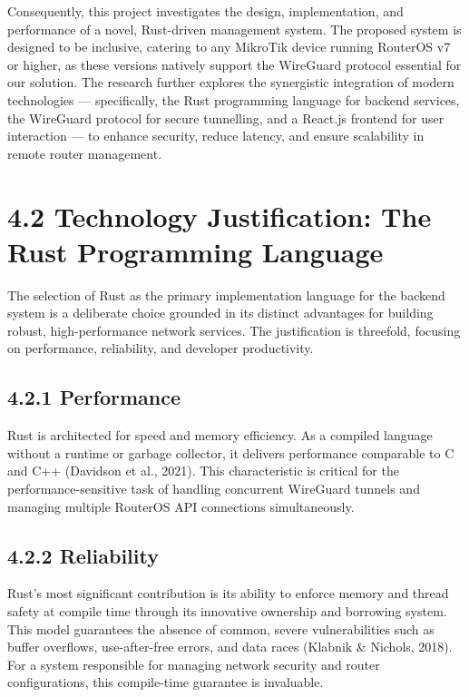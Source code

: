 \documentclass[12pt,a4paper,oneside]{report}
\begin{document}
Consequently, this project investigates the design, implementation, and performance of a novel, Rust-driven management system. The proposed system is designed to be inclusive, catering to any MikroTik device running RouterOS v7 or higher, as these versions natively support the WireGuard protocol essential for our solution. The research further explores the synergistic integration of modern technologies --- specifically, the Rust programming language for backend services, the WireGuard protocol for secure tunnelling, and a React.js frontend for user interaction --- to enhance security, reduce latency, and ensure scalability in remote router management.

\section{4.2 Technology Justification: The Rust Programming Language}

The selection of Rust as the primary implementation language for the backend system is a deliberate choice grounded in its distinct advantages for building robust, high-performance network services. The justification is threefold, focusing on performance, reliability, and developer productivity.

\subsection{4.2.1 Performance}

Rust is architected for speed and memory efficiency. As a compiled language without a runtime or garbage collector, it delivers performance comparable to C and C++ (Davidson et al., 2021). This characteristic is critical for the performance-sensitive task of handling concurrent WireGuard tunnels and managing multiple RouterOS API connections simultaneously.

\subsection{4.2.2 Reliability}

Rust's most significant contribution is its ability to enforce memory and thread safety at compile time through its innovative ownership and borrowing system. This model guarantees the absence of common, severe vulnerabilities such as buffer overflows, use-after-free errors, and data races (Klabnik \& Nichols, 2018). For a system responsible for managing network security and router configurations, this compile-time guarantee is invaluable.
\end{document}
